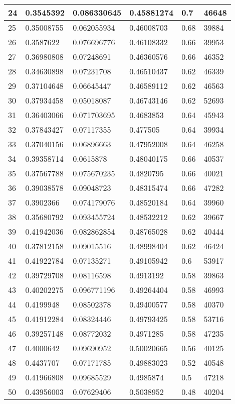 \begin{longtable}{|l|l|l|l|l|l|}
24 & 0.3545392 & 0.086330645 & 0.45881274 & 0.7 & 46648 \\ \hline 
25 & 0.35008755 & 0.062055934 & 0.46008703 & 0.68 & 39884 \\ \hline 
26 & 0.3587622 & 0.076696776 & 0.46108332 & 0.66 & 39953 \\ \hline 
27 & 0.36980808 & 0.07248691 & 0.46360576 & 0.66 & 46352 \\ \hline 
28 & 0.34630898 & 0.07231708 & 0.46510437 & 0.62 & 46339 \\ \hline 
29 & 0.37104648 & 0.06645447 & 0.46589112 & 0.62 & 46563 \\ \hline 
30 & 0.37934458 & 0.05018087 & 0.46743146 & 0.62 & 52693 \\ \hline 
31 & 0.36403066 & 0.071703695 & 0.4683853 & 0.64 & 45943 \\ \hline 
32 & 0.37843427 & 0.07117355 & 0.477505 & 0.64 & 39934 \\ \hline 
33 & 0.37040156 & 0.06896663 & 0.47952008 & 0.64 & 46258 \\ \hline 
34 & 0.39358714 & 0.0615878 & 0.48040175 & 0.66 & 40537 \\ \hline 
35 & 0.37567788 & 0.075670235 & 0.4820795 & 0.66 & 40021 \\ \hline 
36 & 0.39038578 & 0.09048723 & 0.48315474 & 0.66 & 47282 \\ \hline 
37 & 0.3902366 & 0.074179076 & 0.48520184 & 0.64 & 39960 \\ \hline 
38 & 0.35680792 & 0.093455724 & 0.48532212 & 0.62 & 39667 \\ \hline 
39 & 0.41942036 & 0.082862854 & 0.48765028 & 0.62 & 40444 \\ \hline 
40 & 0.37812158 & 0.09015516 & 0.48998404 & 0.62 & 46424 \\ \hline 
41 & 0.41922784 & 0.07135271 & 0.49105942 & 0.6 & 53917 \\ \hline 
42 & 0.39729708 & 0.08116598 & 0.4913192 & 0.58 & 39863 \\ \hline 
43 & 0.40202275 & 0.096771196 & 0.49264404 & 0.58 & 46993 \\ \hline 
44 & 0.4199948 & 0.08502378 & 0.49400577 & 0.58 & 40370 \\ \hline 
45 & 0.41912284 & 0.08324446 & 0.49793425 & 0.58 & 53716 \\ \hline 
46 & 0.39257148 & 0.08772032 & 0.4971285 & 0.58 & 47235 \\ \hline 
47 & 0.4000642 & 0.09690952 & 0.50020665 & 0.56 & 40125 \\ \hline 
48 & 0.4437707 & 0.07171785 & 0.49883023 & 0.52 & 40548 \\ \hline 
49 & 0.41966808 & 0.09685529 & 0.4985874 & 0.5 & 47218 \\ \hline 
50 & 0.43956003 & 0.07629406 & 0.5038952 & 0.48 & 40204 \\ \hline 
\end{longtable}